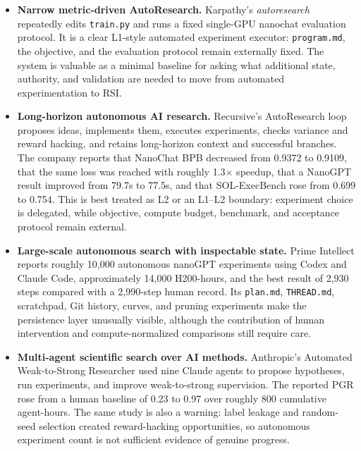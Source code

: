 \begin{itemize}
  \item \textbf{Narrow metric-driven AutoResearch.}
  Karpathy's \emph{autoresearch} repeatedly edits \texttt{train.py} and runs a
  fixed single-GPU nanochat evaluation protocol. It is a clear L1-style
  automated experiment executor: \texttt{program.md}, the objective, and the
  evaluation protocol remain externally fixed. The system is valuable as a
  minimal baseline for asking what additional state, authority, and validation
  are needed to move from automated experimentation to RSI.

  \item \textbf{Long-horizon autonomous AI research.}
  Recursive's AutoResearch loop proposes ideas, implements them, executes
  experiments, checks variance and reward hacking, and retains long-horizon
  context and successful branches. The company reports that NanoChat BPB
  decreased from 0.9372 to 0.9109, that the same loss was reached with roughly
  1.3$\times$ speedup, that a NanoGPT result improved from 79.7s to 77.5s, and
  that SOL-ExecBench rose from 0.699 to 0.754. This is best treated as L2 or an
  L1--L2 boundary: experiment choice is delegated, while objective, compute
  budget, benchmark, and acceptance protocol remain external.

  \item \textbf{Large-scale autonomous search with inspectable state.}
  Prime Intellect reports roughly 10,000 autonomous nanoGPT experiments using
  Codex and Claude Code, approximately 14,000 H200-hours, and the best result of
  2,930 steps compared with a 2,990-step human record. Its \texttt{plan.md},
  \texttt{THREAD.md}, scratchpad, Git history, curves, and pruning experiments
  make the persistence layer unusually visible, although the contribution of
  human intervention and compute-normalized comparisons still require care.

  \item \textbf{Multi-agent scientific search over AI methods.}
  Anthropic's Automated Weak-to-Strong Researcher used nine Claude agents to
  propose hypotheses, run experiments, and improve weak-to-strong supervision.
  The reported PGR rose from a human baseline of 0.23 to 0.97 over roughly 800
  cumulative agent-hours. The same study is also a warning: label leakage and
  random-seed selection created reward-hacking opportunities, so autonomous
  experiment count is not sufficient evidence of genuine progress.


\end{itemize}
